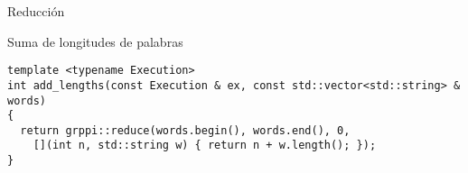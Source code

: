 \begin{frame}[t,fragile]{Reducción}
\begin{block}{Suma de longitudes de palabras}
\begin{lstlisting}
template <typename Execution>
int add_lengths(const Execution & ex, const std::vector<std::string> & words)
{
  return grppi::reduce(words.begin(), words.end(), 0,
    [](int n, std::string w) { return n + w.length(); });
}
\end{lstlisting}
\end{block}
\end{frame}

